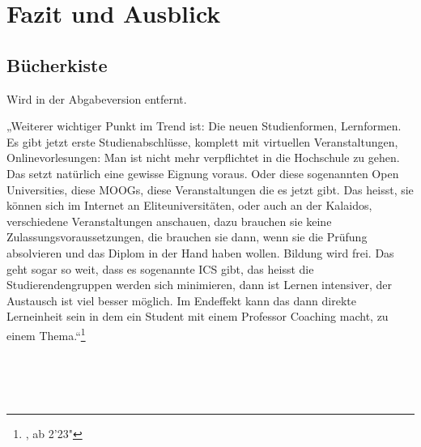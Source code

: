 
\section{Fazit und Ausblick} %
\label{sec:fazit_und_ausblick}



\subsection{Bücherkiste} %
\label{sub:bucherkiste}

Wird in der Abgabeversion entfernt.

„Weiterer wichtiger Punkt im Trend ist: Die neuen Studienformen, Lernformen. Es gibt jetzt erste Studienabschlüsse, komplett mit virtuellen Veranstaltungen, Onlinevorlesungen: Man ist nicht mehr verpflichtet in die Hochschule zu gehen. Das setzt natürlich eine gewisse Eignung voraus. Oder diese sogenannten Open Universities, diese MOOGs, diese Veranstaltungen die es jetzt gibt. Das heisst, sie können sich im Internet an Eliteuniversitäten, oder auch an der Kalaidos, verschiedene Veranstaltungen anschauen, dazu brauchen sie keine Zulassungsvoraussetzungen, die brauchen sie dann, wenn sie die Prüfung absolvieren und das Diplom in der Hand haben wollen. Bildung wird frei. Das geht sogar so weit, dass es sogenannte ICS gibt, das heisst die Studierendengruppen werden sich minimieren, dann ist Lernen intensiver, der Austausch ist viel besser möglich. Im Endeffekt kann das dann direkte Lerneinheit sein in dem  ein Student mit einem Professor Coaching macht, zu einem Thema.“\footnote{\cite{roegner:trends}, ab 2'23"}

\cite{meggle}\\
\cite{ojstersek}\\
\cite{schulmeister}\\


